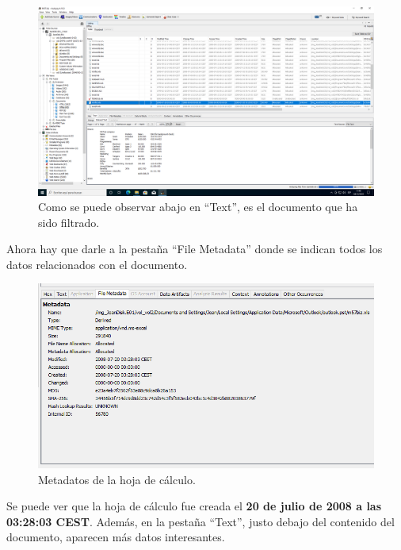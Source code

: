 \documentclass{article}
\begin{document}
\begin{figure}[H]
    \centering
    \includegraphics[width=\textwidth]{imagenes/Windows/Captura de pantalla (5).png}
    \caption{Como se puede observar abajo en ``Text'', es el documento que ha sido filtrado.}
\end{figure}

\newpage

Ahora hay que darle a la pestaña ``File Metadata'' donde se indican todos los datos relacionados con el documento.

\begin{figure}[H]
    \centering
    \includegraphics[width=\textwidth]{imagenes/Windows/Captura de pantalla (6).png}
    \caption{Metadatos de la hoja de cálculo.}
\end{figure}

Se puede ver que la hoja de cálculo fue creada el \textbf{20 de julio de 2008 a las 03:28:03 CEST}. Además, en la pestaña ``Text'', justo debajo del contenido del documento, aparecen más datos interesantes.
\end{document}
